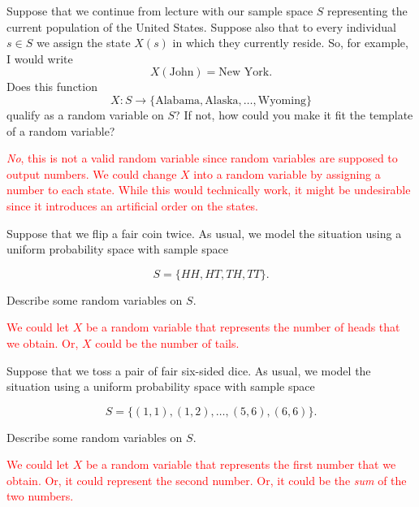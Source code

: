 \documentclass[12pt,reqno]{amsart}
\begin{document}
\bigskip

\prob Suppose that we continue from lecture with our sample space $S$ representing the current population of the United States. Suppose also that to every individual $s\in S$ we assign the state $X(s)$ in which they currently reside. So, for example, I would write
    \[X(\text{John}) = \text{New York}.\]
Does this function
    \[X: S \to \{\text{Alabama}, \text{Alaska},\ldots,\text{Wyoming}\} \]
qualify as a random variable on $S$? If not, how could you make it fit the template of a random variable?

\bigskip
\textcolor{red}{\textit{No}, this is not a valid random variable since random variables are supposed to output numbers. We could change $X$ into a random variable by assigning a number to each state. While this would technically work, it might be undesirable since it introduces an artificial order on the states.}
\bigskip
















\bigskip
\prob Suppose that we flip a fair coin twice. As usual, we model the situation using a uniform probability space with sample space

    \[S = \{ HH, HT, TH, TT\}.\]

Describe some random variables on $S$.

\bigskip
\textcolor{red}{We could let $X$ be a random variable that represents the number of heads that we obtain. Or, $X$ could be the number of tails.}
\bigskip

















\bigskip

\prob Suppose that we toss a pair of fair six-sided dice. As usual, we model the situation using a uniform probability space with sample space

    \[S = \{(1,1),(1,2),\ldots,(5,6),(6,6)\}.\]

Describe some random variables on $S$.

\bigskip
\textcolor{red}{We could let $X$ be a random variable that represents the first number that we obtain. Or, it could represent the second number. Or, it could be the \textit{sum} of the two numbers.}
\bigskip
\end{document}
